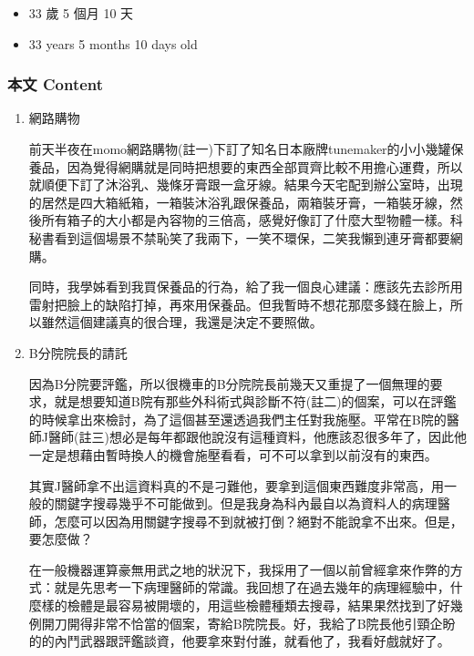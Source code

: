 \documentclass[a5paper, 12pt
]{book}
\providecommand{\tightlist}{%
  \setlength{\itemsep}{0pt}\setlength{\parskip}{0pt}}
\begin{document}
\begin{itemize}
\tightlist
\item
  33 歲 5 個月 10 天
\item
  33 years 5 months 10 days old
\end{itemize}

\hypertarget{ux672cux6587-content-3}{%
\subsubsection{本文 Content}\label{ux672cux6587-content-3}}

\begin{enumerate}
\def\labelenumi{\arabic{enumi}.}
\item
  網路購物

  前天半夜在momo網路購物(註一)下訂了知名日本廠牌tunemaker的小小幾罐保養品，因為覺得網購就是同時把想要的東西全部買齊比較不用擔心運費，所以就順便下訂了沐浴乳、幾條牙膏跟一盒牙線。結果今天宅配到辦公室時，出現的居然是四大箱紙箱，一箱裝沐浴乳跟保養品，兩箱裝牙膏，一箱裝牙線，然後所有箱子的大小都是內容物的三倍高，感覺好像訂了什麼大型物體一樣。科秘書看到這個場景不禁恥笑了我兩下，一笑不環保，二笑我懶到連牙膏都要網購。

  同時，我學姊看到我買保養品的行為，給了我一個良心建議：應該先去診所用雷射把臉上的缺陷打掉，再來用保養品。但我暫時不想花那麼多錢在臉上，所以雖然這個建議真的很合理，我還是決定不要照做。
\item
  B分院院長的請託

  因為B分院要評鑑，所以很機車的B分院院長前幾天又重提了一個無理的要求，就是想要知道B院有那些外科術式與診斷不符(註二)的個案，可以在評鑑的時候拿出來檢討，為了這個甚至還透過我們主任對我施壓。平常在B院的醫師J醫師(註三)想必是每年都跟他說沒有這種資料，他應該忍很多年了，因此他一定是想藉由暫時換人的機會施壓看看，可不可以拿到以前沒有的東西。

  其實J醫師拿不出這資料真的不是刁難他，要拿到這個東西難度非常高，用一般的關鍵字搜尋幾乎不可能做到。但是我身為科內最自以為資料人的病理醫師，怎麼可以因為用關鍵字搜尋不到就被打倒？絕對不能說拿不出來。但是，要怎麼做？

  在一般機器運算豪無用武之地的狀況下，我採用了一個以前曾經拿來作弊的方式：就是先思考一下病理醫師的常識。我回想了在過去幾年的病理經驗中，什麼樣的檢體是最容易被開壞的，用這些檢體種類去搜尋，結果果然找到了好幾例開刀開得非常不恰當的個案，寄給B院院長。好，我給了B院長他引頸企盼的的內鬥武器跟評鑑談資，他要拿來對付誰，就看他了，我看好戲就好了。
\end{enumerate}
\end{document}
